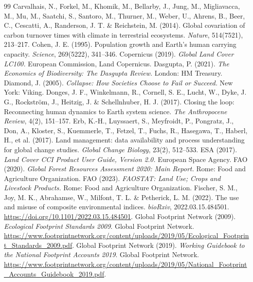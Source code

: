 \documentclass[preprint,12pt,authoryear]{elsarticle}
\begin{document}
\begin{thebibliography}{99}
 Carvalhais, N., Forkel, M., Khomik, M., Bellarby, J., Jung, M., Migliavacca, M., Mu, M., Saatchi, S., Santoro, M., Thurner, M., Weber, U., Ahrens, B., Beer, C., Cescatti, A., Randerson, J. T. \& Reichstein, M. (2014). Global covariation of carbon turnover times with climate in terrestrial ecosystems. \emph{Nature}, 514(7521), 213--217.
 Cohen, J. E. (1995). Population growth and Earth's human carrying capacity. \emph{Science}, 269(5222), 341--346.
 Copernicus (2019). \emph{Global Land Cover LC100.} European Commission, Land Copernicus.
 Dasgupta, P. (2021). \emph{The Economics of Biodiversity: The Dasgupta Review.} London: HM Treasury.
 Diamond, J. (2005). \emph{Collapse: How Societies Choose to Fail or Succeed.} New York: Viking.
 Donges, J. F., Winkelmann, R., Cornell, S. E., Lucht, W., Dyke, J. G., Rockstr\"om, J., Heitzig, J. \& Schellnhuber, H. J. (2017). Closing the loop: Reconnecting human dynamics to Earth system science. \emph{The Anthropocene Review}, 4(2), 151--157.
 Erb, K.-H., Luyssaert, S., Meyfroidt, P., Pongratz, J., Don, A., Kloster, S., Kuemmerle, T., Fetzel, T., Fuchs, R., Hasegawa, T., Haberl, H., et al. (2017). Land management: data availability and process understanding for global change studies. \emph{Global Change Biology}, 23(2), 512--533.
 ESA (2017). \emph{Land Cover CCI Product User Guide, Version 2.0.} European Space Agency.
 FAO (2020). \emph{Global Forest Resources Assessment 2020: Main Report.} Rome: Food and Agriculture Organization.
 FAO (2023). \emph{FAOSTAT: Land Use; Crops and Livestock Products.} Rome: Food and Agriculture Organization.
 Fischer, S. M., Joy, M. K., Abrahamse, W., Milfont, T. L. \& Petherick, L. M. (2022). The use and misuse of composite environmental indices. \emph{bioRxiv}, 2022.03.15.484501. \url{https://doi.org/10.1101/2022.03.15.484501}.
 Global Footprint Network (2009). \emph{Ecological Footprint Standards 2009}. Global Footprint Network. \url{https://www.footprintnetwork.org/content/uploads/2019/05/Ecological_Footprint_Standards_2009.pdf}.
 Global Footprint Network (2019). \emph{Working Guidebook to the National Footprint Accounts 2019}. Global Footprint Network. \url{https://www.footprintnetwork.org/content/uploads/2019/05/National_Footprint_Accounts_Guidebook_2019.pdf}.

\end{thebibliography}
\end{document}

